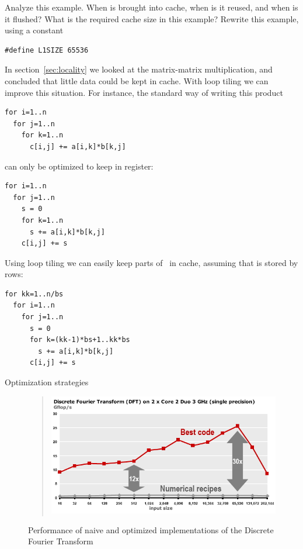 \begin{exercise}
  Analyze this example. When is  brought into cache, when is it
  reused, and when is it flushed? What is the required cache size in
  this example? Rewrite this example, using a constant
\begin{verbatim}
#define L1SIZE 65536
\end{verbatim}
\end{exercise}

In section~\ref{sec:locality} we looked at the matrix-matrix
multiplication, and concluded that little data could be kept in
cache. With loop tiling we can improve this situation. For instance,
the standard way of writing this product
\begin{verbatim}
for i=1..n
  for j=1..n
    for k=1..n
      c[i,j] += a[i,k]*b[k,j]
\end{verbatim}
can only be optimized to keep  in register:
\begin{verbatim}
for i=1..n
  for j=1..n
    s = 0
    for k=1..n
      s += a[i,k]*b[k,j]
    c[i,j] += s
\end{verbatim}
Using loop tiling we can easily keep parts of~ in cache,
assuming that  is stored by rows:
\begin{verbatim}
for kk=1..n/bs
  for i=1..n
    for j=1..n
      s = 0
      for k=(kk-1)*bs+1..kk*bs
        s += a[i,k]*b[k,j]
      c[i,j] += s
\end{verbatim}


 {Optimization strategies}
\label{sec:scalar-opt}

\begin{figure}[ht]
  \begin{quote}
  \includegraphics[scale=.5]{graphics-public/dft}
  \end{quote}
  \caption{Performance of naive and optimized implementations of the Discrete Fourier Transform}
  \label{fig:dft-perf}
\end{figure}

